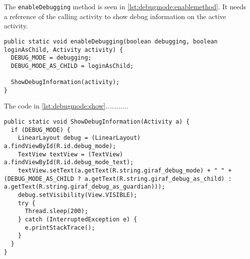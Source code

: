 The \lstinline|enableDebugging| method is seen in \cref{lst:debugmode:enablemethod}.
It needs a reference of the calling activity to show debug information on the active activity.

\begin{lstlisting}[caption={Enable debug mode by calling \lstinline|enableDebugging|.},label={lst:debugmode:enablemethod}]  
public static void enableDebugging(boolean debugging, boolean loginAsChild, Activity activity) {
  DEBUG_MODE = debugging;
  DEBUG_MODE_AS_CHILD = loginAsChild;

  ShowDebugInformation(activity);
}
\end{lstlisting}

The code in \cref{lst:debugmode:show}............


\begin{lstlisting}[caption={Show a debug information on activity if debug is enabled.},label={lst:debugmode:show}]  
public static void ShowDebugInformation(Activity a) {
  if (DEBUG_MODE) {
    LinearLayout debug = (LinearLayout) a.findViewById(R.id.debug_mode);
    TextView textView = (TextView) a.findViewById(R.id.debug_mode_text);
    textView.setText(a.getText(R.string.giraf_debug_mode) + " " + (DEBUG_MODE_AS_CHILD ? a.getText(R.string.giraf_debug_as_child) : a.getText(R.string.giraf_debug_as_guardian)));
    debug.setVisibility(View.VISIBLE);
    try {
      Thread.sleep(200);
    } catch (InterruptedException e) {
      e.printStackTrace();
    }
  }
}
\end{lstlisting}
